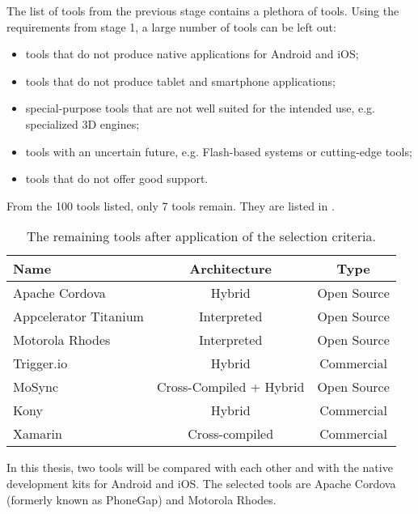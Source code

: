 The list of tools from the previous stage contains a plethora of tools. Using the requirements from stage 1, a large number of tools can be left out:

\begin{itemize}
    \item tools that do not produce native applications for Android and iOS;
    \item tools that do not produce tablet and smartphone applications;
    \item special-purpose tools that are not well suited for the intended use, e.g. specialized 3D engines;
    \item tools with an uncertain future, e.g. Flash-based systems or cutting-edge tools;
    \item tools that do not offer good support. 
\end{itemize}

From the 100 tools listed, only 7 tools remain. They are listed in .

\begin{table}[h!]
    \begin{center}
        \begin{tabular}{l|c|c}
            \textbf{Name} & \textbf{Architecture} & \textbf{Type} \\
            \hline 
            Apache Cordova & Hybrid & Open Source \\
            Appcelerator Titanium & Interpreted & Open Source \\
            Motorola Rhodes & Interpreted & Open Source \\
            Trigger.io & Hybrid & Commercial \\
            MoSync & Cross-Compiled + Hybrid & Open Source \\
            Kony & Hybrid & Commercial \\
            Xamarin & Cross-compiled & Commercial \\
        \end{tabular}
        \label{table:tools}
        \caption{The remaining tools after application of the selection criteria.}
    \end{center}
\end{table}

In this thesis, two tools will be compared with each other and with the native development kits for Android and iOS. The selected tools are Apache Cordova (formerly known as PhoneGap) and Motorola Rhodes. 

